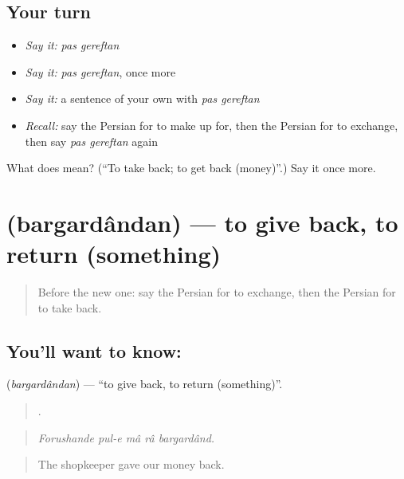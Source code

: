 \subsection*{Your turn}
\begin{itemize}
\raggedright
  \item \emph{Say it:} \emph{pas gereftan}
  \item \emph{Say it:} \emph{pas gereftan}, once more
  \item \emph{Say it:} a sentence of your own with \emph{pas gereftan}
  \item \emph{Recall:} say the Persian for to make up for, then the Persian for to exchange, then say \emph{pas gereftan} again
\end{itemize}

\begin{tcolorbox}[breakable,colback=teal!4,colframe=teal!35!black,title={Before you move on}]
What does   mean? (\textquotedblleft{}To take back; to get back (money)\textquotedblright{}.) Say it once more.
\end{tcolorbox}
\section[\texorpdfstring{\fa{برگرداندن} (bargardândan)}{برگرداندن (bargardândan)}]{ (bargardândan) — to give back, to return (something)}

\label{lesson:FA-C442-bargardandan}



\begin{quote}
Before the new one: say the Persian for to exchange, then the Persian for to take back.
\end{quote}

\subsection*{You'll want to know: }
\textbf{} (\emph{bargardândan}) — \textquotedblleft{}to give back, to return (something)\textquotedblright{}.

\begin{quote}
    .
\end{quote}

\begin{quote}
\emph{Forushande pul-e mâ râ bargardând.}
\end{quote}

\begin{quote}
The shopkeeper gave our money back.
\end{quote}

